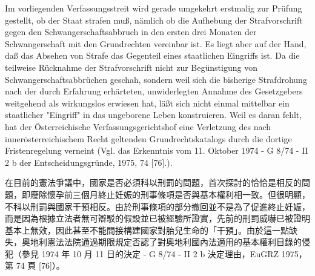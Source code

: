 \documentclass[12pt]{article}
\begin{document}
\syncleft
\begin{sourcepara}
Im vorliegenden Verfassungsstreit wird gerade umgekehrt erstmalig zur Prüfung gestellt, ob der Staat strafen muß, nämlich ob die Aufhebung der Strafvorschrift gegen den Schwangerschaftsabbruch in den ersten drei Monaten der Schwangerschaft mit den Grundrechten vereinbar ist. Es liegt aber auf der Hand, daß das Absehen von Strafe das Gegenteil eines staatlichen Eingriffs ist. Da die teilweise Rücknahme der Strafvorschrift nicht zur Begünstigung von Schwangerschaftsabbrüchen geschah, sondern weil sich die bisherige Strafdrohung nach der durch Erfahrung erhärteten, unwiderlegten Annahme des Gesetzgebers weitgehend als wirkungslos erwiesen hat, läßt sich nicht einmal mittelbar ein staatlicher "Eingriff" in das ungeborene Leben konstruieren. Weil es daran fehlt, hat der Österreichische Verfassungsgerichtshof eine Verletzung des nach innerösterreichischem Recht geltenden Grundrechtskatalogs durch die dortige Fristenregelung verneint (Vgl. das Erkenntnis vom 11. Oktober 1974 - G 8/74 - II 2 b der Entscheidungsgründe, \abbrEuGRZ{} 1975, \abbrS{} 74 [76].).
\end{sourcepara}
\begin{transpara}
在目前的憲法爭議中，國家是否必須科以刑罰的問題，首次探討的恰恰是相反的問題，即廢除懷孕前三個月終止妊娠的刑事條項是否與基本權利相一致。但很明顯，不科以刑罰與國家干預相反。由於刑事條項的部分撤回並不是為了促進終止妊娠，而是因為根據立法者無可辯駁的假設並已被經驗所證實，先前的刑罰威嚇已被證明基本上無效，因此甚至不能間接構建國家對胎兒生命的「干預」。由於這一點缺失，奧地利憲法法院通過期限規定否認了對奧地利國內法適用的基本權利目錄的侵犯（參見 1974 年 10 月 11 日的決定 - G 8/74 - II 2 b 決定理由，EuGRZ 1975，第 74 頁 [76]）。
\end{transpara}
\end{document}
